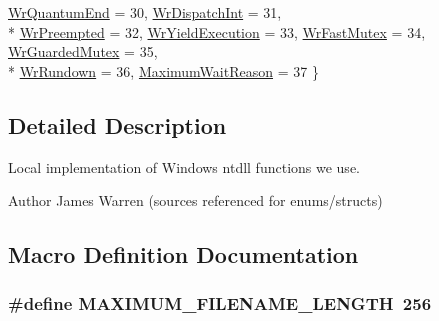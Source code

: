 \begin{DoxyCompactItemize}
\hyperlink{ntdll_8h_a32f8868bc010efa7da787526013b93fba997d9d64e312a72bde6918e42d546df5}{Wr\-Quantum\-End} = 30, 
\hyperlink{ntdll_8h_a32f8868bc010efa7da787526013b93fba88c2e6158d2042274614a4f26d020801}{Wr\-Dispatch\-Int} = 31, 
\\*
\hyperlink{ntdll_8h_a32f8868bc010efa7da787526013b93fbab7bf3ed2c07b3c8fd89fa4ca71b2d271}{Wr\-Preempted} = 32, 
\hyperlink{ntdll_8h_a32f8868bc010efa7da787526013b93fba42d0ec1df734874fe5f6eaae5804d616}{Wr\-Yield\-Execution} = 33, 
\hyperlink{ntdll_8h_a32f8868bc010efa7da787526013b93fbac0372499f802bb433d86b7a66f87e3aa}{Wr\-Fast\-Mutex} = 34, 
\hyperlink{ntdll_8h_a32f8868bc010efa7da787526013b93fba08bd72ed89d58e4a864ea7e9b2310288}{Wr\-Guarded\-Mutex} = 35, 
\\*
\hyperlink{ntdll_8h_a32f8868bc010efa7da787526013b93fba225bf8a24fd5089538d7807566245509}{Wr\-Rundown} = 36, 
\hyperlink{ntdll_8h_a32f8868bc010efa7da787526013b93fbace7c70038ba60a65a6d9d9a83000bbb1}{Maximum\-Wait\-Reason} = 37
 \}
\end{DoxyCompactItemize}


\subsection{Detailed Description}
Local implementation of Windows ntdll functions we use. \begin{DoxyAuthor}{Author}
James Warren (sources referenced for enums/structs) 
\end{DoxyAuthor}


\subsection{Macro Definition Documentation}
\subsubsection[{M\-A\-X\-I\-M\-U\-M\-\_\-\-F\-I\-L\-E\-N\-A\-M\-E\-\_\-\-L\-E\-N\-G\-T\-H}]{\setlength{\rightskip}{0pt plus 5cm}\#define M\-A\-X\-I\-M\-U\-M\-\_\-\-F\-I\-L\-E\-N\-A\-M\-E\-\_\-\-L\-E\-N\-G\-T\-H~256}\label{ntdll_8h_a4fc6529ce775df5fb3ceff4e7674db71}


